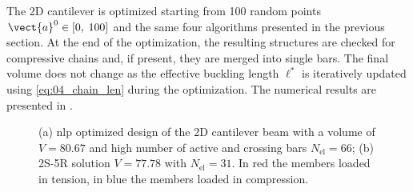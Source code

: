 The 2D cantilever is optimized starting from 100 random points $\vect{a}^0 \in [0,\;100]$ and the same four algorithms presented in the previous section. At the end of the optimization, the resulting structures are checked for compressive chains and, if present, they are merged into single bars. The final volume does not change as the effective buckling length $\ell^*$ is iteratively updated using \eqref{eq:04_chain_len} during the optimization. The numerical results are presented in .

\begin{figure}
    \centering
    \hspace*{\fill}
    \hfill
    \hspace*{\fill}
    \caption{(a) \gls{nlp} optimized design of the 2D cantilever beam with a volume of $V=80.67$ and high number of active and crossing bars $N_{\text{el}}=66$; (b) 2S-5R solution $V=77.78$ with $N_{\text{el}}=31$. In red the members loaded in tension, in blue the members loaded in compression.}
    \label{fig:04_2d_cant_sol}
\end{figure}


